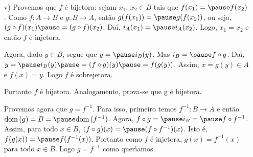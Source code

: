 \documentclass{beamer}
\begin{document}
    \begin{frame}
        \begin{enumerate}
            \item[v)] Provemos que $f$ \'e bijetora: \pause sejam $x_1$, \pause $x_2 \in B$ \pause tais que $f(x_1) = \pause f(x_2)$. \pause Como $f : A \to B$ \pause e $g : B \to A$, \pause ent{\~a}o $g(f(x_1)) = \pause g(f(x_2))$, \pause ou seja, \pause $(g\circ f)(x_1) \pause = (g\circ f)(x_2)$. \pause Da{\'\i}, $i_{A}(x_1) = \pause i_{A}(x_2)$. \pause Logo, \pause $x_1 = x_2$ \pause \linebreak e ent\~ao $f$ {\'e} injetora.\pause

            \vspace{.3cm}

            Agora, dado $y \in B$, \pause segue que $y = \pause i_{B}(y)$. \pause Mas $i_{B} = \pause f\circ g$. \pause Da{\'\i}, \pause $y = \pause i_{B}(y) \pause = (f\circ g)(y) \pause = f(g(y))$. \pause Assim, \pause $x = g(y) \in A$ \pause e $f(x) = y$. \pause Logo $f$ {\'e} sobrejetora.\pause

            \vspace{.3cm}

            Portanto $f$ {\'e} bijetora. \pause Analogamente, prova-se que g {\'e} bijetora.\pause

            \vspace{.3cm}

            Provemos agora que \pause $g = f^{-1}$. \pause Para isso, \pause primeiro temos \linebreak $f^{-1} : B \to A$ \pause e ent\~ao $\dom(g) = B = \pause \dom(f^{-1})$. \pause Agora, $f\circ g = \pause i_{B} = \pause f\circ f^{-1}$. \pause Assim, para todo $x \in B$, \pause $(f\circ g)(x) = \pause (f\circ f^{-1})(x)$. \pause Isto {\'e}, \pause $f(g(x)) = \pause f(f^{-1}(x))$. \pause Portanto como $f$ \'e injetora, \pause $g(x) = f^{-1}(x)$ \pause para todo $x \in B$. \pause Logo $g = f^{-1}$ \pause como quer{\'\i}amos.\pause \hspace{.5cm} \qedsymbol
        \end{enumerate}
    \end{frame}
\end{document}

